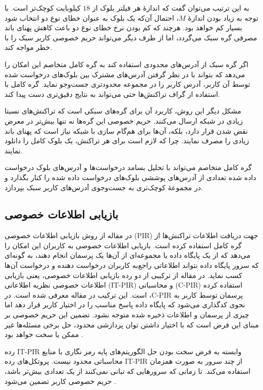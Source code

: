به این ترتیب می‌توان گفت که اندازهٔ هر فیلتر بلوک از $18$ کیلوبایت کوچک‌تر است. با توجه به زیاد بودن اندازهٔ $M$، احتمال آن‌که یک بلوک به عنوان خطای نوع دو انتخاب شود بسیار کم خواهد بود. هرچند که کم بودن نرخ خطای نوع دو باعث کاهش پهنای باند مصرفی گره سبک می‌گردد، اما از طرف دیگر می‌تواند حریم خصوصی کاربر سبک را با خطر مواجه کند.

اگر گره سبک از آدرس‌های محدودی استفاده کند به گره کامل متخاصم این امکان را می‌دهد که بتواند با در نظر گرفتن آدرس‌های مشترک بین بلوک‌های درخواست شده توسط آن کاربر، آدرس کاربر را در مجموعه محدود‌تری جست‌وجو نماید. گره کامل با استفاده از گراف تراکنش‌ها حتی می‌تواند به نتایج دقیق‌تری دست پیدا کند\cite{blockfilter-wiki}.

مشکل دیگر این روش، کاربرد آن برای گره‌های سبکی است که تراکنش‌های نسبتا زیادی در شبکه ارسال می‌کنند. حریم خصوصی این گره‌ها نه تنها بیش‌تر در معرض نقض شدن قرار دارد، بلکه، آن‌ها برای هم‌گام سازی با شبکه نیاز است که پهنای باند زیادی را مصرف نمایند. چرا که لازم است برای هر تراکنش، یک بلوک کامل را دانلود نمایند.

گره کامل متخاصم می‌تواند با تحلیل‌ بسامد درخواست‌ها و آدرس‌های بلوک درخواست داده شده تعدادی از آدرس‌های پوششی بلوک‌های درخواست داده شده را کنار بگذارد و در مجموعهٔ کوچک‌تری به جست‌و‌جوی آدرس‌‌های کاربر سبک بپردازد.

\subsection{بازیابی اطلاعات خصوصی}
\label{PIR}
در مقاله \cite{Qin2019} از روش بازیابی اطلاعات خصوصی (PIR) جهت دریافت اطلاعات تراکنش‌ها از گره‌ کامل استفاده کرده است. بازیابی اطلاعات خصوصی به کاربران این امکان را می‌دهد که از یک پایگاه داده یا مجموعه‌ای از آن‌ها یک پرسمان انجام دهند، به گونه‌ای که سرور پایگاه داده نتواند اطلاعاتی راجع‌به کاربران درخواست دهنده و درخواست آن‌ها کسب نماید. در مقاله \cite{Qin2019}  از ترکیبی از دو رده بازیابی اطلاعات خصوصی، یعنی بازیابی اطلاعات خصوصی نظریه اطلاعاتی (IT-PIR) و محاسباتی (C-PIR) استفاده کرده است. این ترکیب در مقاله \cite{Devet2014} معرفی شده است. در ،C-PIR پرسمان توسط کاربر به نحوی کدگذاری می‌شود که پایگاه داده پاسخ مناسب را در اختیار کاربر قرار دهد اما چیزی از پرسمان و اطلاعات ذخیره شده متوجه نشود. تضمین این حریم خصوصی بر مبنای این فرض است که با اختیار داشتن توان پردازشی محدود، حل برخی مسئله‌ها  غیر ممکن یا سخت خواهد بود \cite{Devet2014}.

رده IT-PIR وابسته به فرض سخت بودن حل الگوریتم‌های پایه رمز نگاری با منابع محاسباتی محدود نیست. پروتکل‌های رده IT-PIR از چند سرور به صورت همزمان استفاده می‌کند. تا زمانی که سرورهایی که تبانی نمی‌کنند از یک تعدادی بیش‌تر باشد، حریم خصوصی کاربر تضمین می‌شود \cite{Devet2014}. 

